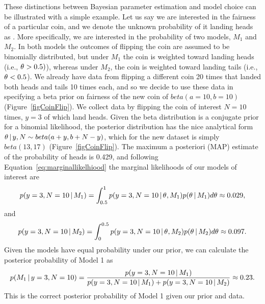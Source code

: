 These distinctions between Bayesian parameter estimation and model choice can
be illustrated with a simple example.
Let us say we are interested in the fairness of a particular coin, and we
denote the unknown probability of it landing heads as \myTheta{}.
More specifically, we are interested in the probability of two models, $M_1$
and $M_2$.
In both models the outcomes of flipping the coin are assumed to be binomially
distributed, but under $M_1$ the coin is weighted toward landing heads (i.e.,
$\theta_{} > 0.5)$), whereas under $M_2$, the coin is weighted toward landing
tails (i.e., $\theta_{} < 0.5$).
We already have data from flipping a different coin 20 times that landed both
heads and tails 10 times each, and so we decide to use these data in specifying
a beta prior on fairness of the new coin of $beta(a=10, b=10)$
(Figure~\ref{figCoinFlip}).
We collect data by flipping the coin of interest $N=10$ times, $y=3$ of which
land heads.
Given the beta distribution is a conjugate prior for a binomial likelihood, the
posterior distribution has the nice analytical form $\theta \,|\, y,N \sim
beta(a + y, b + N - y)$, which for the new dataset is simply $beta(13, 17)$
(Figure~\ref{figCoinFlip}).
The maximum a posteriori (MAP) estimate of the probability of heads is 0.429,
and following Equation~\ref{eq:marginallikelhiood} the marginal likelihoods of
our models of interest are
\begin{equation}
    p(y=3, N=10 \,|\, M_1) = \int_{0.5}^{1} p(y=3, N=10 \,|\,
    \theta_{}, M_1)p(\theta_{} \,|\, M_1) d\theta_{} \approx 0.029,
\end{equation}
and
\begin{equation}
    p(y=3, N=10 \,|\, M_2) = \int_{0}^{0.5} p(y=3, N=10 \,|\,
    \theta_{}, M_2)p(\theta_{} \,|\, M_2) d\theta_{} \approx 0.097.
\end{equation}
Given the models have equal probability under our prior, we can calculate the
posterior probability of Model 1 as
\begin{equation}
    p(M_1 \,|\, y=3, N=10) = \frac{p(y=3, N=10 \,|\, M_1)}{p(y=3, N=10 \,|\,
    M_1) + p(y=3, N=10 \,|\, M_2)} \approx 0.23.
\end{equation}
This is the correct posterior probability of Model 1 given our prior
and data.

